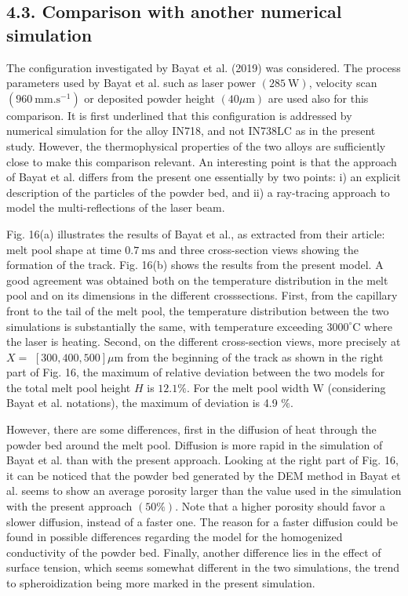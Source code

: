 \documentclass[10pt]{article}
\begin{document}
\subsection*{4.3. Comparison with another numerical simulation}
The configuration investigated by Bayat et al. (2019) was considered. The process parameters used by Bayat et al. such as laser power $(285 \mathrm{~W})$, velocity scan $\left(960 \mathrm{~mm} . \mathrm{s}^{-1}\right)$ or deposited powder height $(40 \mu \mathrm{m})$ are used also for this comparison. It is first underlined that this configuration is addressed by numerical simulation for the alloy IN718, and not IN738LC as in the present study. However, the thermophysical properties of the two alloys are sufficiently close to make this comparison relevant. An interesting point is that the approach of Bayat et al. differs from the present one essentially by two points: i) an explicit description of the particles of the powder bed, and ii) a ray-tracing approach to model the multi-reflections of the laser beam.

Fig. 16(a) illustrates the results of Bayat et al., as extracted from their article: melt pool shape at time $0.7 \mathrm{~ms}$ and three cross-section views showing the formation of the track. Fig. 16(b) shows the results from the present model. A good agreement was obtained both on the temperature distribution in the melt pool and on its dimensions in the different crosssections. First, from the capillary front to the tail of the melt pool, the temperature distribution between the two simulations is substantially the same, with temperature exceeding $3000^{\circ} \mathrm{C}$ where the laser is heating. Second, on the different cross-section views, more precisely at $X=$ $[300,400,500] \mu \mathrm{m}$ from the beginning of the track as shown in the right part of Fig. 16, the maximum of relative deviation between the two models for the total melt pool height $H$ is $12.1 \%$. For the melt pool width $\mathrm{W}$ (considering Bayat et al. notations), the maximum of deviation is 4.9 $\%$.

However, there are some differences, first in the diffusion of heat through the powder bed around the melt pool. Diffusion is more rapid in the simulation of Bayat et al. than with the present approach. Looking at the right part of Fig. 16, it can be noticed that the powder bed generated by the DEM method in Bayat et al. seems to show an average porosity larger than the value used in the simulation with the present approach $(50 \%)$. Note that a higher porosity should favor a slower diffusion, instead of a faster one. The reason for a faster diffusion could be found in possible differences regarding the model for the homogenized conductivity of the powder bed. Finally, another difference lies in the effect of surface tension, which seems somewhat different in the two simulations, the trend to spheroidization being more marked in the present simulation.
\end{document}
